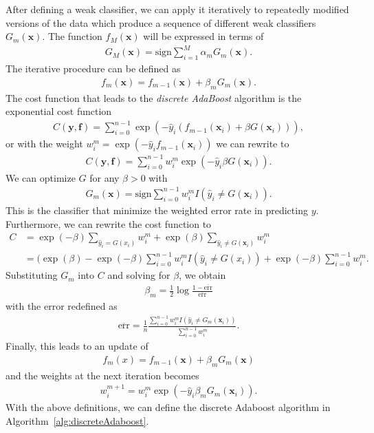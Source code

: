 After defining a weak classifier, we can apply it iteratively to repeatedly modified versions of the data which produce a sequence of different weak classifiers $G_m(\textbf{x})$. The function $f_M(\textbf{x})$ will be expressed in terms of
\begin{align}
  G_M(\textbf{x})=\text{sign}\sum_{i=1}^M \alpha_mG_m(\textbf{x}).
\end{align}
The iterative procedure can be defined as
\begin{align}
  f_m(\textbf{x}) = f_{m-1}(\textbf{x}) + \beta_mG_m(\textbf{x}).
\end{align}
The cost function that leads to the \textit{discrete AdaBoost}  algorithm \cite{Friedman2000} is the exponential cost function
\begin{align}
  C(\textbf{y},\textbf{f}) = \sum_{i=0}^{n-1} \exp (-\hat{y}_i(f_{m-1}(\textbf{x}_i) + \beta G(\textbf{x}_i))),
\end{align}
or with the weight $w_i^m = \exp(-\hat{y}_if_{m-1}(\textbf{x}_i))$ we can rewrite to
\begin{align}
  C(\textbf{y},\textbf{f}) = \sum_{i=0}^{n-1} w_i^m \exp(-\hat{y}_i\beta G(\textbf{x}_i)).
\end{align}
We can optimize $G$ for any $\beta>0$ with
\begin{align}
  G_m(\textbf{x}) = \text{sign} \sum_{i=0}^{n-1} w_i^m I(\hat{y}_i \neq G(\textbf{x}_i)).
\end{align}
This is the classifier that minimize the weighted error rate in predicting $y$. Furthermore, we can rewrite the cost function to
\begin{align}
    C &= \exp(-\beta) \sum_{\hat{y}_i=G(x_i)} w_i^m + \exp (\beta) \sum_{\hat{y}_i \neq G(\textbf{x}_i)} w_i^m \\
    &= (\exp(\beta)-\exp(-\beta)\sum_{i=0}^{n-1} w_i^m I(\hat{y}_i \neq G(x_i)) + \exp(-\beta)\sum_{i=0}^{n-1}w_i^m .
\end{align}
Substituting $G_m$ into $C$ and solving for $\beta$, we obtain
\begin{align}
  \beta_m = \frac{1}{2} \log \frac{1 - \overline{\text{err}}}{\overline{\text{err}}}
\end{align}
with the error redefined as
\begin{align}
  \overline{\text{err}} = \frac{1}{n} \frac{ \sum_{i=0}^{n-1} w_i^m I(\hat{y}_i \neq G_m(\textbf{x}_i)) }{\sum_{i=0}^{n-1} w_i^m}.
\end{align}
Finally, this leads to an update of
\begin{align}
  f_m(x) = f_{m-1}(\textbf{x}) + \beta_m G_m (\textbf{x})
\end{align}
and the weights at the next iteration becomes
\begin{align}
  w_i^{m+1} = w_i^m \exp (-\hat{y}_i \beta_m G_m(\textbf{x}_i)).
\end{align}
With the above definitions, we can define the discrete Adaboost algorithm in Algorithm~\ref{alg:discreteAdaboost}.

